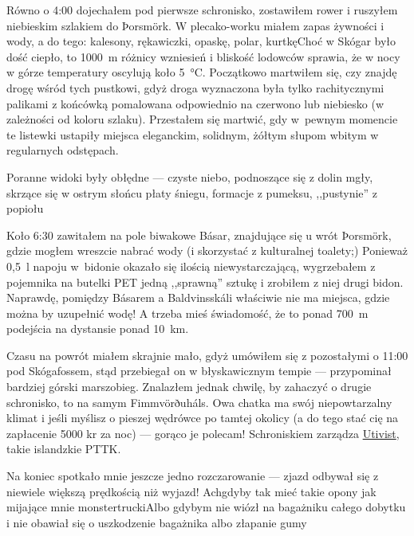 
Równo o 4:00 dojechałem pod pierwsze schronisko, zostawiłem rower i ruszyłem niebieskim szlakiem do Þorsmörk. W plecako-worku miałem zapas żywności i wody, a do tego: kalesony, rękawiczki, opaskę, polar, kurtkę\textellipsis Choć w Skógar było dość ciepło, to 1000~m różnicy wzniesień i bliskość lodowców sprawia, że w nocy w górze temperatury oscylują koło 5~°C. Początkowo martwiłem się, czy znajdę drogę wśród tych pustkowi, gdyż droga wyznaczona była tylko rachitycznymi palikami z końcówką pomalowana odpowiednio na czerwono lub niebiesko (w zależności od koloru szlaku). Przestałem się martwić, gdy w~pewnym momencie te listewki ustapiły miejsca eleganckim, solidnym, żółtym słupom wbitym w regularnych odstępach.

Poranne widoki były obłędne --- czyste niebo, podnoszące się z dolin mgły, skrzące się w ostrym słońcu płaty śniegu, formacje z pumeksu, ,,pustynie'' z popiołu\textellipsis

Koło 6:30 zawitałem na pole biwakowe Básar,  znajdujące się u wrót Þorsmörk, gdzie mogłem wreszcie nabrać wody (i skorzystać z kulturalnej toalety;) Ponieważ 0,5~l napoju w~bidonie okazało się ilością niewystarczającą, wygrzebałem z pojemnika na butelki PET jedną ,,sprawną'' sztukę i zrobiłem z niej drugi bidon. Naprawdę, pomiędzy Básarem a Baldvinsskáli właściwie nie ma miejsca, gdzie można by uzupełnić wodę! A trzeba mieś świadomość, że to ponad 700~m podejścia na dystansie ponad 10~km.

Czasu na powrót miałem skrajnie mało, gdyż umówiłem się z pozostałymi o 11:00 pod Skógafossem, stąd przebiegał on w błyskawicznym tempie --- przypominał bardziej górski marszobieg. Znalazłem jednak chwilę, by zahaczyć o drugie schronisko, to na samym Fimmvörðuháls. Owa chatka ma swój niepowtarzalny klimat i jeśli myślisz o pieszej wędrówce po tamtej okolicy (a do tego stać cię na zapłacenie 5000 kr za noc) --- gorąco je polecam! Schroniskiem zarządza \href{http://www.utivist.is/english}{Utivist}, takie islandzkie PTTK.

Na koniec spotkało mnie jeszcze jedno rozczarowanie --- zjazd odbywał się z niewiele większą prędkością niż wyjazd! Ach\textellipsis gdyby tak mieć takie opony jak mijające mnie monstertrucki\textellipsis Albo gdybym nie wiózł na bagażniku całego dobytku i nie obawiał się o uszkodzenie bagażnika albo złapanie gumy\textellipsis



